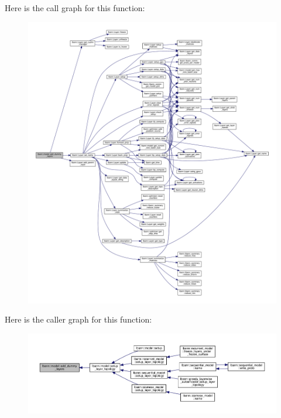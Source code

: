 Here is the call graph for this function\+:\nopagebreak
\begin{figure}[H]
\begin{center}
\leavevmode
\includegraphics[width=350pt]{classlbann_1_1model_a6ba9a836e5ba52c999c5234cfa5e62c2_cgraph}
\end{center}
\end{figure}
Here is the caller graph for this function\+:\nopagebreak
\begin{figure}[H]
\begin{center}
\leavevmode
\includegraphics[width=350pt]{classlbann_1_1model_a6ba9a836e5ba52c999c5234cfa5e62c2_icgraph}
\end{center}
\end{figure}
\mbox{\label{classlbann_1_1model_a5dfa9895024f07d273062b67d7a0dc01}} 
